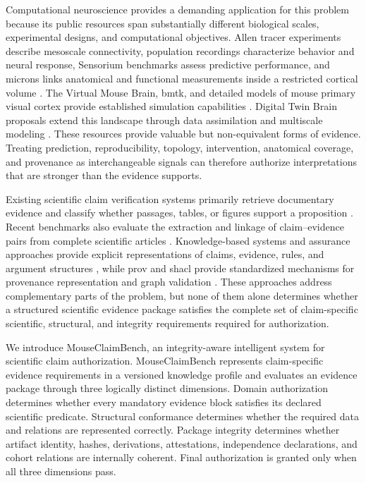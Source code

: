 \documentclass[11pt,a4paper]{article}
\begin{document}
Computational neuroscience provides a demanding application for this problem
because its public resources span substantially different biological scales,
experimental designs, and computational objectives. Allen tracer experiments
describe mesoscale connectivity, population recordings characterize behavior
and neural response, Sensorium benchmarks assess predictive performance, and
\ac{microns} links anatomical and functional measurements inside a restricted
cortical volume
\citep{oh2014mesoscale,willeke2022sensorium,turishcheva2023dynamic,bae2025microns}.
The Virtual Mouse Brain, \ac{bmtk}, and detailed models of mouse primary
visual cortex provide established simulation capabilities
\citep{melozzi2017virtualmouse,dai2020bmtk,billeh2020v1}. Digital Twin Brain
proposals extend this landscape through data assimilation and multiscale
modeling \citep{xiong2023dtb,chen2026mousedtb}. These resources provide
valuable but non-equivalent forms of evidence. Treating prediction,
reproducibility, topology, intervention, anatomical coverage, and provenance
as interchangeable signals can therefore authorize interpretations that are
stronger than the evidence supports.

Existing scientific claim verification systems primarily retrieve documentary
evidence and classify whether passages, tables, or figures support a
proposition
\citep{wadden2020scifact,wadden2022multivers,lu2023scitab,wang2025sciver}.
Recent benchmarks also evaluate the extraction and linkage of claim--evidence
pairs from complete scientific articles \citep{javaji2025claimbench}.
Knowledge-based systems and assurance approaches provide explicit
representations of claims, evidence, rules, and argument structures
\citep{buchanan1984rulebased,studer1998knowledge,mohamad2021assurance},
while \ac{prov} and \ac{shacl} provide standardized mechanisms for provenance
representation and graph validation
\citep{lebo2013provo,w3c2017shacl}. These approaches address complementary
parts of the problem, but none of them alone determines whether a structured
scientific evidence package satisfies the complete set of claim-specific
scientific, structural, and integrity requirements required for authorization.

We introduce MouseClaimBench, an integrity-aware intelligent system for
scientific claim authorization. MouseClaimBench represents claim-specific
evidence requirements in a versioned knowledge profile and evaluates an
evidence package through three logically distinct dimensions. Domain
authorization determines whether every mandatory evidence block satisfies its
declared scientific predicate. Structural conformance determines whether the
required data and relations are represented correctly. Package integrity
determines whether artifact identity, hashes, derivations, attestations,
independence declarations, and cohort relations are internally coherent.
Final authorization is granted only when all three dimensions pass.
\end{document}
